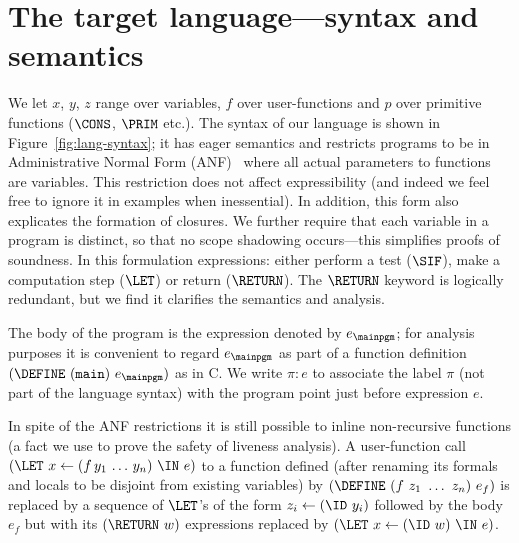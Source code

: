

\section{The target language---syntax and semantics}
\label{sec:defs}
We let $x$, $y$, $z$ range over variables, $f$ over user-functions and
$p$ over  primitive functions ($\CONS$, $\PRIM$ etc.).   The syntax of
our language  is shown  in Figure~\ref{fig:lang-syntax}; it  has eager
semantics and  restricts programs to be in  Administrative Normal Form
(ANF)~\cite{chakravarty03perspective}  where all actual  parameters to
functions   are   variables.   This   restriction   does  not   affect
expressibility (and indeed we feel  free to ignore it in examples when
inessential). In addition, this  form also explicates the formation of
closures.  We further  require  that  each variable  in  a program  is
distinct, so  that no scope shadowing  occurs---this simplifies proofs
of soundness.  In this  formulation expressions: either perform a test
($\SIF$), make a computation step ($\LET$) or return ($\RETURN$).  The
$\RETURN$ keyword is logically redundant, but we find it clarifies the
semantics and analysis.


The body of the program is
the  expression denoted  by  $e_\mainpgm$; for analysis purposes
it is convenient
to regard $e_\mainpgm$ as part of a function definition
$(\DEFINE\ ({\tt main})\ e_\mainpgm)$ as in C\@.
We write  $\pi\!:\!e$ to  associate the label  $\pi$ (not part  of the
language syntax) with the program point just before expression $e$.

In spite of the ANF restrictions it is still possible
to inline non-recursive functions (a fact we use to prove the safety
of liveness analysis).  A user-function call
$(\LET\,\, x \leftarrow (f\,y_1\,\ldots\,y_n) \,\, \IN\,\, e)$
to a function defined
(after renaming its formals and locals to be disjoint from existing variables)
by $(\DEFINE\ (f\ z_1\ \ldots\ z_n)\ e_f)$
is replaced by a sequence of $\LET$'s of the form
$z_i\leftarrow (\ID\,\,y_i)$ followed by
the body $e_f$ but with its $(\RETURN\,\,w)$ expressions replaced by
$(\LET\,\, x \leftarrow (\ID\,\, w) \,\, \IN\,\, e)$.

